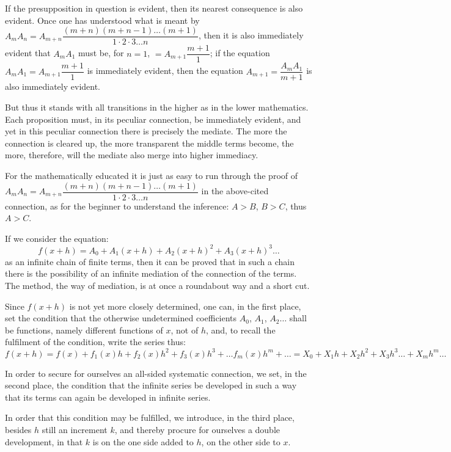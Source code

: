 \documentclass[12pt]{book}
\begin{document}
If the presupposition in question is evident, then its nearest consequence is also
evident. Once one has understood what is meant by
$A_m A_n = A_{m+n}\dfrac{(m+n)(m+n-1)\dots(m+1)}{1\cdot 2\cdot 3\dots n}$, then it is
also immediately evident that $A_m A_1$ must be, for $n = 1$,
$= A_{m+1}\dfrac{m+1}{1}$; if the equation $A_m A_1 = A_{m+1}\dfrac{m+1}{1}$ is
immediately evident, then the equation $A_{m+1} = \dfrac{A_m A_1}{m+1}$ is also
immediately evident.

But thus it stands with all transitions in the higher as in the lower mathematics.
Each proposition must, in its peculiar connection, be immediately evident, and yet in
this peculiar connection there is precisely the mediate. The more the connection is
cleared up, the more transparent the middle terms become, the more, therefore, will
the mediate also merge into higher immediacy.

For the mathematically educated it is just as easy to run through the proof of
$A_m A_n = A_{m+n}\dfrac{(m+n)(m+n-1)\dots(m+1)}{1\cdot 2\cdot 3\dots n}$ in the
above-cited connection, as for the beginner to understand the inference: $A > B$,
$B > C$, thus $A > C$.

If we consider the equation:
\[
f(x+h) = A_0 + A_1(x+h) + A_2(x+h)^{2} + A_3(x+h)^{3}\dots
\]
as an infinite chain of finite terms, then it can be proved that in such a chain
there is the possibility of an infinite mediation of the connection of the terms. The
method, the way of mediation, is at once a roundabout way and a short cut.

Since $f(x+h)$ is not yet more closely determined, one can, in the first place, set
the condition that the otherwise undetermined coefficients $A_0$, $A_1$, $A_2\dots$
shall be functions, namely different functions of $x$, not of $h$, and, to recall the
fulfilment of the condition, write the series thus:
\[
f(x+h) = f(x) + f_1(x)h + f_2(x)h^{2} + f_3(x)h^{3} + \dots f_m(x)h^{m} + \dots
= X_0 + X_1 h + X_2 h^{2} + X_3 h^{3}\dots + X_m h^{m}\dots
\]

In order to secure for ourselves an all-sided systematic connection, we set, in the
second place, the condition that the infinite series be developed in such a way that
its terms can again be developed in infinite series.

In order that this condition may be fulfilled, we introduce, in the third place,
besides $h$ still an increment $k$, and thereby procure for ourselves a double
development, in that $k$ is on the one side added to $h$, on the other side to $x$.
\end{document}
